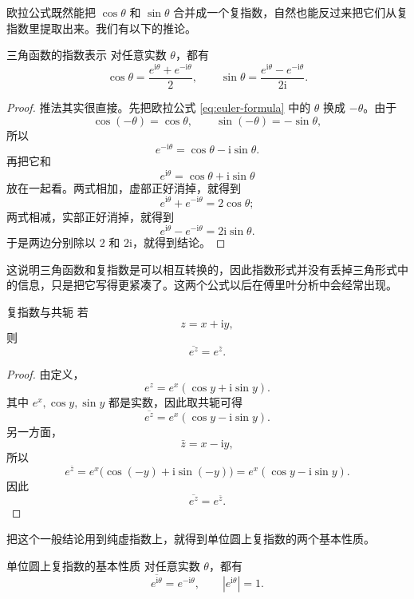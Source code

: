 欧拉公式既然能把 $\cos\theta$ 和 $\sin\theta$ 合并成一个复指数，自然也能反过来把它们从复指数里提取出来。我们有以下的推论。
\begin{tuilun}{三角函数的指数表示}{}
对任意实数 $\theta$，都有
\begin{equation}
    \cos\theta=\frac{e^{\mathrm{i}\theta}+e^{-\mathrm{i}\theta}}{2},\qquad
    \sin\theta=\frac{e^{\mathrm{i}\theta}-e^{-\mathrm{i}\theta}}{2\mathrm{i}}.
\end{equation}
\end{tuilun}

\begin{proof}
推法其实很直接。先把欧拉公式 \eqref{eq:euler-formula} 中的 $\theta$ 换成 $-\theta$。由于
\[
\cos(-\theta)=\cos\theta,\qquad \sin(-\theta)=-\sin\theta,
\]
所以
\[
e^{-\mathrm{i}\theta}=\cos\theta-\mathrm{i}\sin\theta.
\]
再把它和
\[
e^{\mathrm{i}\theta}=\cos\theta+\mathrm{i}\sin\theta
\]
放在一起看。两式相加，虚部正好消掉，就得到
\[
e^{\mathrm{i}\theta}+e^{-\mathrm{i}\theta}=2\cos\theta;
\]
两式相减，实部正好消掉，就得到
\[
e^{\mathrm{i}\theta}-e^{-\mathrm{i}\theta}=2\mathrm{i}\sin\theta.
\]
于是两边分别除以 $2$ 和 $2\mathrm{i}$，就得到结论。
\end{proof}

这说明三角函数和复指数是可以相互转换的，因此指数形式并没有丢掉三角形式中的信息，只是把它写得更紧凑了。这两个公式以后在傅里叶分析中会经常出现。

\begin{dingli}{复指数与共轭}{}
若
\[
z=x+\mathrm{i}y,
\]
则
\begin{equation}
    \overline{e^z}=e^{\bar z}.
\end{equation}
\end{dingli}

\begin{proof}
由定义，
\[
e^z=e^x(\cos y+\mathrm{i}\sin y).
\]
其中 $e^x,\cos y,\sin y$ 都是实数，因此取共轭可得
\[
\overline{e^z}=e^x(\cos y-\mathrm{i}\sin y).
\]
另一方面，
\[
\bar z=x-\mathrm{i}y,
\]
所以
\[
e^{\bar z}=e^x\bigl(\cos(-y)+\mathrm{i}\sin(-y)\bigr)
=e^x(\cos y-\mathrm{i}\sin y).
\]
因此
\[
\overline{e^z}=e^{\bar z}.
\]
\end{proof}

把这个一般结论用到纯虚指数上，就得到单位圆上复指数的两个基本性质。
\begin{tuilun}{单位圆上复指数的基本性质}{}
对任意实数 $\theta$，都有
\begin{equation}
    \overline{e^{\mathrm{i}\theta}}=e^{-\mathrm{i}\theta},\qquad |e^{\mathrm{i}\theta}|=1.
\end{equation}
\end{tuilun}


